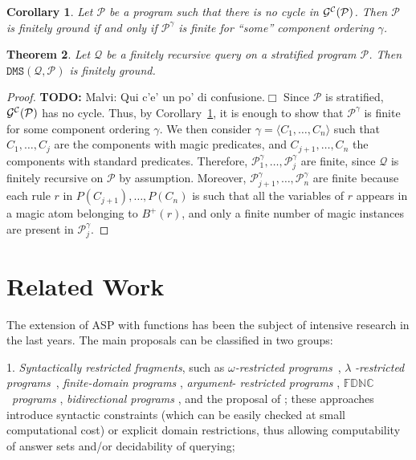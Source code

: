 \documentclass{tlp}
\newcommand{\TODO}[1]{{\large\bf TODO: }#1\ensuremath{\Box}}
\newcommand{\p}{\ensuremath{{\mathcal{P}}}}
\newcommand{\intelligent}{\ensuremath{\p}}
\newcommand{\R}{\ensuremath{r}}
\newcommand{\posbody}[1]{\ensuremath{B^+(#1)}}
\newtheorem{theorem}{Theorem}[section]
\newtheorem{corollary}[theorem]{Corollary}
\newcommand{\Q}{\mathcal{Q}}
\newcommand{\DMS}{\ensuremath{\mathtt{DMS}}}
\begin{document}
{\begin{corollary}\label{cor:finitelyGroundSome}
Let $\p$ be a program such that there is no cycle in ${\cal G^C}(\p)$.
Then $\p$ is finitely ground if and only if
$\p^\gamma$ is finite for ``some'' component ordering $\gamma$.
\end{corollary}



\begin{theorem}\label{theo:magicFinitelyGround}
Let $\Q$ be a finitely recursive query on a stratified program $\p$.
Then $\DMS(\Q,\p)$ is finitely ground.
\end{theorem}
\begin{proof}
\TODO{Malvi: Qui c'e' un po' di confusione.}
Since $\p$ is stratified, ${\cal G^C}(\p)$ has no cycle.
Thus, by Corollary~\ref{cor:finitelyGroundSome}, it is enough to show that 
$\p^\gamma$ is finite for some component ordering $\gamma$.
We then consider $\gamma = \langle C_1, \ldots, C_n \rangle$ such that
$C_1, \ldots, C_j$ are the components with magic predicates,
and $C_{j+1}, \ldots, C_n$ the components with standard predicates.
Therefore, $\intelligent_1^\gamma, \ldots, \intelligent_j^\gamma$ are finite, 
since $\Q$ is finitely recursive on $\p$ by assumption.
Moreover, $\intelligent_{j+1}^\gamma, \ldots, \intelligent_n^\gamma$ are finite because
each rule $\R$ in $P(C_{j+1}), \ldots, P(C_n)$ is such that all the variables
of $\R$ appears in a magic atom belonging to $\posbody{\R}$,
and only a finite number of magic instances are present in $\intelligent_j^\gamma$.
\end{proof}
}

\section{Related Work}\label{sec:relatedwork}

\newcommand{\ldl}{$\mathcal{LDL}$\xspace}
\newcommand{\fdnc}{$\mathbb{FDNC}$\xspace}
\newcommand\dependson{\geqslant}



The extension of ASP with functions has been the subject
of intensive research in the last years.
The main proposals can be classified in two groups:

1. {\em Syntactically restricted fragments}, such as
    $\omega${\em -restricted
    programs}~\cite{syrj-2001}, $\lambda${\em
    -restricted programs}~\cite{gebs-etal-2007-lpnmr},
    {\em finite-domain programs}
    \cite{cali-etal-2008-iclp}, {\em argument}-{\em
    restricted programs} \cite{lier-lifs-2009-iclp},
    \fdnc\ {\em programs} \cite{simk-eite-2007-lpar},
    {\em bidirectional programs}
    \cite{eite-simk-2009-ijcai}, and the proposal of
    \cite{lin-wang-2008-KR}; these approaches introduce
    syntactic constraints (which can be easily checked
    at small computational cost) or explicit domain
    restrictions, thus allowing computability of answer
    sets and/or decidability of querying;
\end{document}
